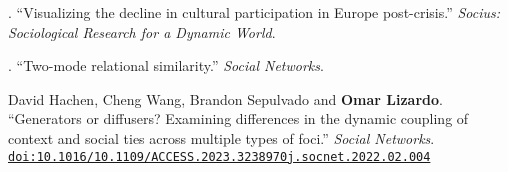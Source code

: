 
. ``Visualizing the decline in cultural participation in Europe post-crisis.'' {\em Socius: Sociological Research for a Dynamic World}.

. ``Two-mode relational similarity.'' {\em Social Networks}.

\ind David Hachen, Cheng Wang, Brandon Sepulvado and {\bf Omar Lizardo}. ``Generators or diffusers? Examining differences in the dynamic coupling of context and social ties across multiple types of foci.'' {\em Social Networks}. \href{https://doi.org/10.1016/j.socnet.2022.02.004}{\nolinkurl{doi:10.1016/10.1109/ACCESS.2023.3238970j.socnet.2022.02.004}}
